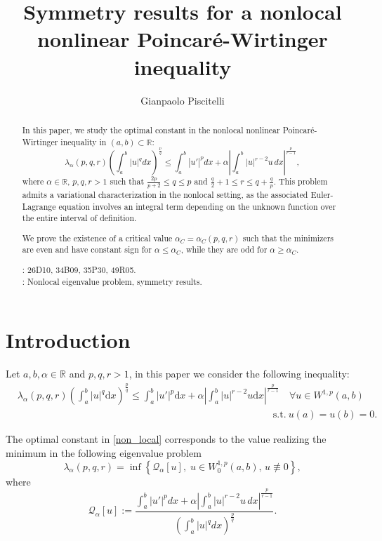 \documentclass{amsart}
\title[nonlocal Poincaré-Wirtinger inequality]{Symmetry results for a nonlocal nonlinear Poincaré-Wirtinger inequality}
\author{Gianpaolo Piscitelli}
\date{}
\theoremstyle{definition}
\theoremstyle{remark}
\newcommand{\R}{\mathbb{R}}
\DeclareMathOperator{\dint}{\displaystyle\int}
\begin{document}
\maketitle
\begin{abstract}
\noindent In this paper, we study the optimal constant in the nonlocal nonlinear Poincar\'e-Wirtinger inequality in $(a,b)\subset\mathbb R$:
\begin{equation*}
\lambda_\alpha(p,q,r){\left(\int_{a}^{b}|u|^{q}dx\right)^\frac pq}\le{\int_{a}^{b}|u'|^{p}dx+\alpha\left|\int_{a}^{b}|u|^{r-2}u\, dx\right|^{\frac p{r-1}}},
\end{equation*}where $\alpha\in\mathbb R$, $p,q,r >1$ such that $\frac{2p}{p+2}\le q\le p$ and $\frac q2+1\le r \le
q+\frac q p$. 
This problem admits a variational characterization in the nonlocal setting, as the associated Euler-Lagrange equation involves an integral term depending on the unknown function over the entire interval of definition.
 
We prove the existence of a critical value $\alpha_C=\alpha_C (p,q,r)$ such that the minimizers are even and have constant sign for $\alpha\le\alpha_{C}$, while they are odd for $\alpha\geq \alpha_{C}$.

: 26D10, 34B09, 35P30, 49R05.\\
: Nonlocal eigenvalue problem, symmetry results.
\end{abstract}



\section{Introduction}
Let $a,b, \alpha \in\R$ and $p,q,r>1$, in this paper we consider the following inequality:
\begin{equation}\label{non_local}
\begin{split}
&\lambda_\alpha(p,q,r) \left(\int_a^b|u|^q\text{d}x\right)^\frac pq\leq\int_a^b|u'|^p\text{d}x+\alpha\left|\int_a^b |u|^{r-2}u\text{d}x\right|^\frac p {r-1}\quad\forall u \in W^{1,p}(a,b)\\
&\qquad\qquad\qquad\qquad\qquad\qquad\qquad\qquad\qquad\qquad\qquad\qquad\qquad \text{s.t.}\ u(a)=u(b)=0.
\end{split}
\end{equation}

The optimal constant in \eqref{non_local} corresponds to the value realizing the minimum in the following eigenvalue problem
\begin{equation}
\label{operat}
\lambda_\alpha(p,q,r)=\inf \left\{ \mathcal Q_\alpha[u],\; u\in W_0^{1,p}(a,b),\,u\not\equiv 0 \right\},
\end{equation}
where 
\begin{equation}
\label{Qualpha}
\mathcal Q_{\alpha}[u]:=\dfrac{\dint_{a}^{b}|u'|^{p}dx+\alpha\left|\dint_{a}^{b}|u|^{r-2}u\, dx\right|^{\frac p{r-1}}}{\left(\dint_{a}^{b}|u|^{q}dx\right)^\frac pq}.
\end{equation}
\end{document}
